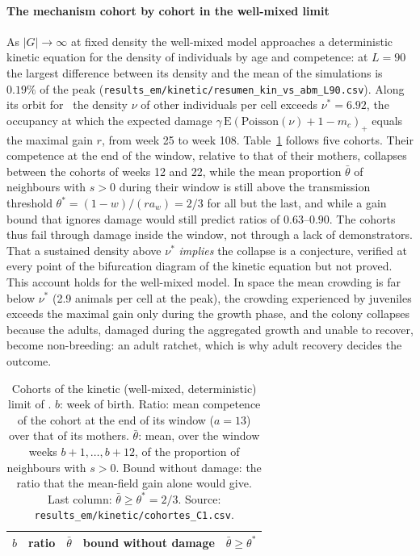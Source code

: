 \paragraph{The mechanism cohort by cohort in the well-mixed limit}
As $|G|\to\infty$ at fixed density the well-mixed model approaches a deterministic kinetic equation for the
density of individuals by age and competence: at $L=90$ the largest difference between its density and the mean of the
simulations is $0.19\%$ of the peak (\texttt{results\_em/kinetic/resumen\_kin\_vs\_abm\_L90.csv}).
Along its orbit for \Cone\ the density $\nu$ of other individuals per cell exceeds $\nu^*=6.92$, the occupancy at which
the expected damage $\gamma\,\mathrm{E}(\mathrm{Poisson}(\nu)+1-m_c)_+$ equals the maximal gain $r$, from week 25 to
week 108. Table~\ref{tab:sm-cohorts} follows five cohorts. Their competence at the end of the window, relative to
that of their mothers, collapses between the cohorts of weeks 12 and 22, while the mean proportion $\bar\theta$ of
neighbours with $s>0$ during their window is still above the transmission threshold $\theta^*=(1-w)/(ra_w)=2/3$ for
all but the last, and while a gain bound that ignores damage would still predict ratios of $0.63$--$0.90$. The cohorts
thus fail through damage inside the window, not through a lack of demonstrators. That a sustained density above
$\nu^*$ \emph{implies} the collapse is a conjecture, verified at every point of the bifurcation diagram of the kinetic
equation but not proved. This account holds for the well-mixed model. In space the
mean crowding is far below $\nu^*$ (2.9 animals per cell at the peak), the crowding experienced by juveniles exceeds
the maximal gain only during the growth phase, and the colony collapses because the adults, damaged during the
aggregated growth and unable to recover, become non-breeding: an adult ratchet, which is why adult recovery decides
the outcome.

\begin{table}[ht]
\centering
\caption{Cohorts of the kinetic (well-mixed, deterministic) limit of \Cone. $b$: week of birth. Ratio: mean competence
of the cohort at the end of its window ($a=13$) over that of its mothers. $\bar\theta$: mean, over the window weeks
$b+1,\dots,b+12$, of the proportion of neighbours with $s>0$. Bound without damage: the ratio that the mean-field gain
alone would give. Last column: $\bar\theta\ge\theta^*=2/3$. Source:
\texttt{results\_em/kinetic/cohortes\_C1.csv}.}
\label{tab:sm-cohorts}
\footnotesize
\begin{tabular}{@{}ccccc@{}}
\toprule
$b$ & ratio & $\bar\theta$ & bound without damage & $\bar\theta\ge\theta^*$ \\
\midrule

\end{tabular}
\end{table}

